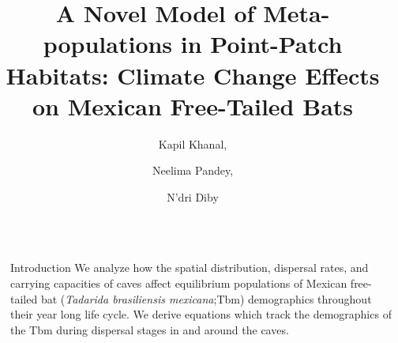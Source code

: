 \documentclass[final]{beamer}
\title{A Novel Model of Meta-populations in Point-Patch Habitats: Climate Change Effects on Mexican Free-Tailed Bats}
\author{Kapil Khanal,  \and Neelima Pandey, \and N'dri Diby }
\institute[shortinst]{Winona State University }
\newlength{\sepwidth}
\newlength{\colwidth}
\newcommand{\separatorcolumn}{\begin{column}{\sepwidth}\end{column}}
\begin{document}
\begin{frame}[t]
\begin{columns}[t]
\separatorcolumn

\begin{column}{\colwidth}

  \begin{block}{Introduction}
We analyze how the spatial distribution, dispersal rates, and carrying capacities of caves affect equilibrium populations of Mexican free-tailed bat (\textit {Tadarida brasiliensis mexicana};Tbm) demographics throughout their year long life cycle. We derive equations which track the demographics of the Tbm during dispersal stages in and around the caves.

\begin{figure}
      \hfill
\hfill
{}

\end{figure}
\end{block}
\end{column}
\end{columns}
\end{frame}
\end{document}
